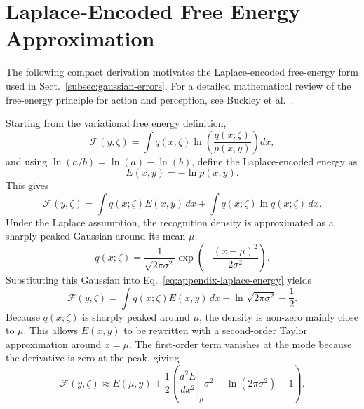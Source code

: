 \section{Laplace-Encoded Free Energy Approximation}
\label{app:laplace-free-energy}

The following compact derivation motivates the Laplace-encoded free-energy form used in Sect.~\ref{subsec:gaussian-errors}. For a detailed mathematical review of the free-energy principle for action and perception, see Buckley et al.~\cite{buckley_free_2017}.

Starting from the variational free energy definition,
\begin{equation}
    \mathcal{F}(y,\zeta)
    =
    \int q(x;\zeta)
    \ln
    \left(
        \frac{q(x;\zeta)}{p(x,y)}
    \right) dx ,
\end{equation}
and using $\ln(a/b)=\ln(a)-\ln(b)$, define the Laplace-encoded energy as
\begin{equation}
    E(x,y)=-\ln p(x,y).
\end{equation}
This gives
\begin{equation}
    \mathcal{F}(y,\zeta)
    =
    \int q(x;\zeta)E(x,y)\,dx
    +
    \int q(x;\zeta)\ln q(x;\zeta)\,dx .
    \label{eq:appendix-laplace-energy}
\end{equation}
Under the Laplace assumption, the recognition density is approximated as a sharply peaked Gaussian around its mean $\mu$:
\begin{equation}
    q(x;\zeta)
    =
    \frac{1}{\sqrt{2\pi\sigma^2}}
    \exp
    \left(
        -\frac{(x-\mu)^2}{2\sigma^2}
    \right).
\end{equation}
Substituting this Gaussian into Eq.~\ref{eq:appendix-laplace-energy} yields
\begin{equation}
    \mathcal{F}(y,\zeta)
    =
    \int q(x;\zeta)E(x,y)\,dx
    -
    \ln\sqrt{2\pi\sigma^2}
    -
    \frac{1}{2}.
\end{equation}
Because $q(x;\zeta)$ is sharply peaked around $\mu$, the density is non-zero mainly close to $\mu$. This allows $E(x,y)$ to be rewritten with a second-order Taylor approximation around $x=\mu$. The first-order term vanishes at the mode because the derivative is zero at the peak, giving
\begin{equation}
    \mathcal{F}(y,\zeta)
    \approx
    E(\mu,y)
    +
    \frac{1}{2}
    \left(
        \left.
        \frac{d^2E}{dx^2}
        \right|_{\mu}
        \sigma^2
        -
        \ln(2\pi\sigma^2)
        -
        1
    \right).
    \label{eq:appendix-laplace-taylor}
\end{equation}
